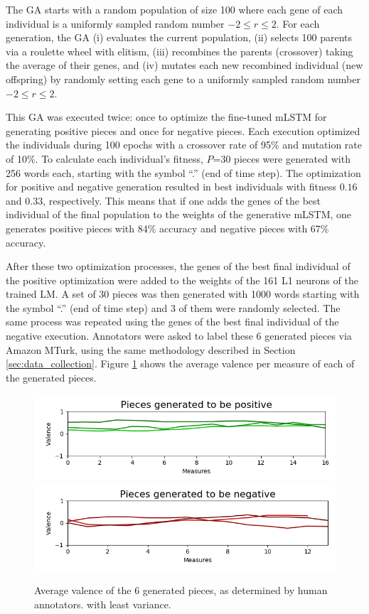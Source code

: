 The GA starts with a random population of size 100 where each gene of each individual is a uniformly sampled random number $-2 \leq r \leq 2$. For each generation, the GA (i) evaluates the current population, (ii) selects 100 parents via a roulette wheel with elitism, (iii) recombines the parents (crossover) taking the average of their genes, and (iv) mutates each new recombined individual (new offspring) by randomly setting each gene to a uniformly sampled random number $-2 \leq r \leq 2$.

This GA was executed twice: once to optimize the fine-tuned mLSTM for generating positive pieces and once for negative pieces. Each execution optimized the individuals during 100 epochs with a crossover rate of 95\% and mutation rate of 10\%. To calculate each individual's fitness, $P$=30 pieces were generated with 256 words each, starting with the symbol ``.'' (end of time step). The optimization for positive and negative generation resulted in best individuals with fitness $0.16$ and $0.33$, respectively. This means that if one adds the genes of the best individual of the final population to the weights of the generative mLSTM, one generates positive pieces with 84\% accuracy and negative pieces with 67\% accuracy.

After these two optimization processes, the genes of the best final individual of the positive optimization were added to the weights of the 161 L1 neurons of the trained LM. A set of 30 pieces was then generated with 1000 words starting with the symbol ``.'' (end of time step) and 3 of them were randomly selected. The same process was repeated using the genes of the best final individual of the negative execution. Annotators were asked to label these 6 generated pieces via Amazon MTurk, using the same methodology described in Section \ref{sec:data_collection}. Figure \ref{fig:generated_eval} shows the average valence per measure of each of the generated pieces.

\begin{figure}[!h]
 \includegraphics[width=\columnwidth]{imgs/ismir19/means_pos.png}
 \includegraphics[width=\columnwidth]{imgs/ismir19/means_neg.png}
 \caption{Average valence of the 6 generated pieces, as determined by human annotators.
 with least variance.}
 \label{fig:generated_eval}
\end{figure}

